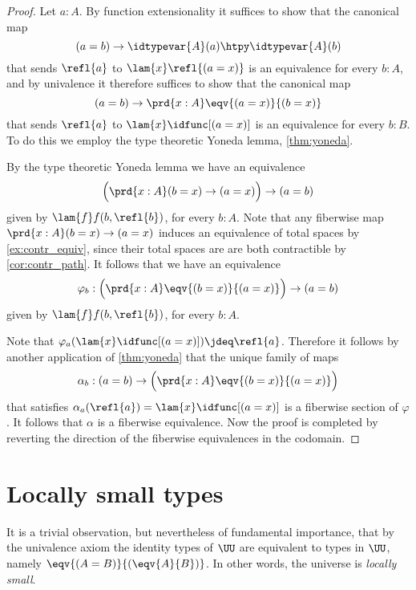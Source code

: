 \begin{proof}
Let $a:A$. By function extensionality it suffices to show that the canonical map
\begin{equation*}
(a=b)\to \idtypevar{A}(a)\htpy\idtypevar{A}(b)
\end{equation*}
that sends $\refl{a}$ to $\lam{x}\refl{(a=x)}$ is an equivalence for every $b:A$, and by univalence it therefore suffices to show that the canonical map
\begin{equation*}
(a=b)\to \prd{x:A}\eqv{(a=x)}{(b=x)}
\end{equation*}
that sends $\refl{a}$ to $\lam{x}\idfunc[(a=x)]$ is an equivalence for every $b:B$. To do this we employ the type theoretic Yoneda lemma, \autoref{thm:yoneda}.

By the type theoretic Yoneda lemma we have an equivalence
\begin{equation*}
\Big(\prd{x:A} (b=x)\to (a=x)\Big)\to (a=b)
\end{equation*}
given by $\lam{f} f(b,\refl{b})$, for every $b:A$. Note that any fiberwise map $\prd{x:A}(b=x)\to (a=x)$ induces an equivalence of total spaces by \autoref{ex:contr_equiv}, since their total spaces are are both contractible by \autoref{cor:contr_path}. It follows that we have an equivalence
\begin{equation*}
\varphi_b:\Big(\prd{x:A} \eqv{(b=x)}{(a=x)}\Big)\to (a=b)
\end{equation*}
given by $\lam{f} f(b,\refl{b})$, for every $b:A$. 

Note that $\varphi_a(\lam{x}\idfunc[(a=x)])\jdeq\refl{a}$. Therefore it follows by another application of \autoref{thm:yoneda} that the unique family of maps 
\begin{equation*}
\alpha_b:(a=b)\to \Big(\prd{x:A} \eqv{(b=x)}{(a=x)}\Big)
\end{equation*}
that satisfies $\alpha_a(\refl{a})=\lam{x}\idfunc[(a=x)]$ is a fiberwise section of $\varphi$. 
It follows that $\alpha$ is a fiberwise equivalence. Now the proof is completed by reverting the direction of the fiberwise equivalences in the codomain.
\end{proof}

\section{Locally small types}
It is a trivial observation, but nevertheless of fundamental importance, that by the univalence axiom the identity types of $\UU$ are equivalent to types in $\UU$, namely $\eqv{(A=B)}{(\eqv{A}{B})}$. In other words, the universe is \emph{locally small}.

